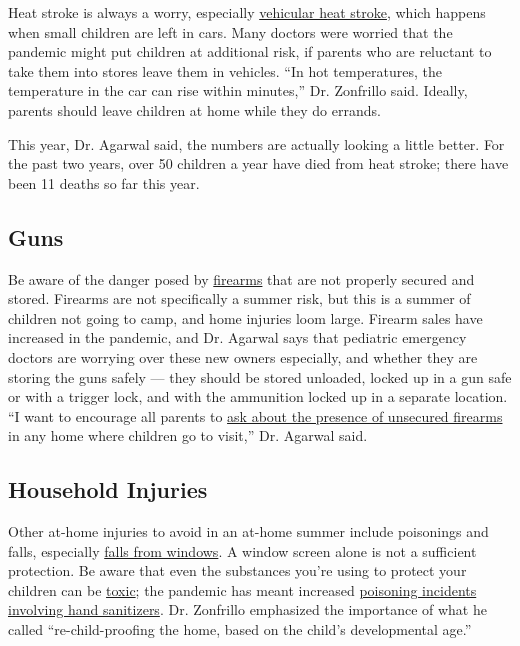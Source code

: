 Heat stroke is always a worry, especially
\href{https://www.kidsandcars.org/how-kids-get-hurt/heat-stroke/}{vehicular
heat stroke}, which happens when small children are left in cars. Many
doctors were worried that the pandemic might put children at additional
risk, if parents who are reluctant to take them into stores leave them
in vehicles. ``In hot temperatures, the temperature in the car can rise
within minutes,'' Dr. Zonfrillo said. Ideally, parents should leave
children at home while they do errands.

This year, Dr. Agarwal said, the numbers are actually looking a little
better. For the past two years, over 50 children a year have died from
heat stroke; there have been 11 deaths so far this year.

\hypertarget{guns}{%
\subsection{Guns}\label{guns}}

Be aware of the danger posed by
\href{https://well.blogs.nytimes3xbfgragh.onion/2013/01/07/keeping-guns-away-from-children/}{firearms}
that are not properly secured and stored. Firearms are not specifically
a summer risk, but this is a summer of children not going to camp, and
home injuries loom large. Firearm sales have increased in the pandemic,
and Dr. Agarwal says that pediatric emergency doctors are worrying over
these new owners especially, and whether they are storing the guns
safely --- they should be stored unloaded, locked up in a gun safe or
with a trigger lock, and with the ammunition locked up in a separate
location. ``I want to encourage all parents to
\href{https://well.blogs.nytimes3xbfgragh.onion/2016/06/24/ask-well-gun-storage-and-children/}{ask
about the presence of unsecured firearms} in any home where children go
to visit,'' Dr. Agarwal said.

\hypertarget{household-injuries}{%
\subsection{Household Injuries}\label{household-injuries}}

Other at-home injuries to avoid in an at-home summer include poisonings
and falls, especially
\href{https://www.nsc.org/home-safety/safety-topics/child-safety/window-safety\#:~:text=Falls\%20from\%20windows\%20are\%20more,to\%20go\%20to\%20the\%20hospital.}{falls
from windows}. A window screen alone is not a sufficient protection. Be
aware that even the substances you're using to protect your children can
be
\href{https://www.nytimes3xbfgragh.onion/2020/06/22/health/fda-Eskbiochem-toxic-hand-sanitizer-virus.html?searchResultPosition=1}{toxic};
the pandemic has meant increased
\href{https://www.healthychildren.org/English/health-issues/conditions/COVID-19/Pages/Keep-Hand-Sanitizer-Out-of-Childrens-Reach.aspx\#:~:text=Children\%20and\%20adults\%20also\%20have,after\%20repeated\%20use\%20on\%20skin.}{poisoning
incidents involving hand sanitizers}. Dr. Zonfrillo emphasized the
importance of what he called ``re-child-proofing the home, based on the
child's developmental age.''


